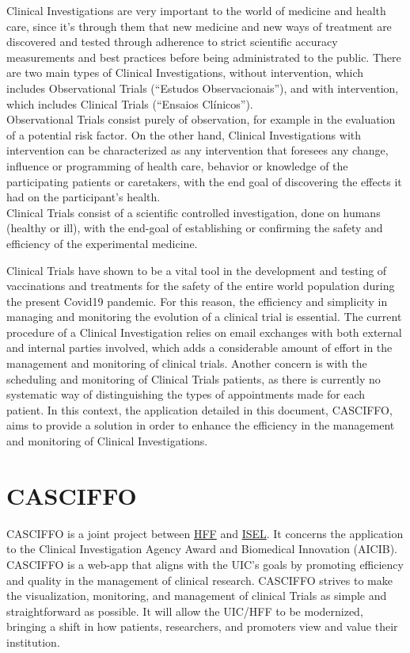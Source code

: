 Clinical Investigations are very important to the world of medicine and
health care, since it's through them that new medicine and new ways of
treatment are discovered and tested through adherence to strict
scientific accuracy measurements and best practices before being
administrated to the public. There are two main types of Clinical
Investigations, without intervention, which includes Observational
Trials (``Estudos Observacionais''), and with intervention, which
includes Clinical Trials (``Ensaios Clínicos'').\\
Observational Trials consist purely of observation, for example in the
evaluation of a potential risk factor. On the other hand, Clinical
Investigations with intervention can be characterized as any
intervention that foresees any change, influence or programming of
health care, behavior or knowledge of the participating patients or
caretakers, with the end goal of discovering the effects it had on the
participant's health.\\
Clinical Trials consist of a scientific controlled investigation, done
on humans (healthy or ill), with the end-goal of establishing or confirming the safety and efficiency of the experimental medicine.  

Clinical Trials have shown to be a vital tool in the development and testing of vaccinations and treatments for the safety of the entire world population during the present Covid19 pandemic. For this reason, the efficiency and simplicity in managing and monitoring the evolution of a clinical trial is essential.  
The current procedure of a Clinical Investigation relies on email exchanges with both external and internal parties involved, which adds a considerable amount of effort in the management and monitoring of clinical trials. Another concern is with the scheduling and monitoring of Clinical Trials patients, as there is currently no systematic way of distinguishing the types of appointments made for each patient.  
In this context, the application detailed in this document, CASCIFFO, aims to provide a solution in order to enhance the efficiency in the management and monitoring of Clinical Investigations.


\section{CASCIFFO}\label{c2-s2-casciffo}

CASCIFFO is a joint project between \href{https://hff.min-saude.pt/}{HFF} and \href{https://www.isel.pt/}{ISEL}. It concerns the application to the Clinical Investigation Agency Award and Biomedical Innovation (AICIB).  
CASCIFFO is a web-app that aligns with the UIC's goals by promoting efficiency and quality in the management of clinical research.
CASCIFFO strives to make the visualization, monitoring, and management of clinical Trials as simple and straightforward as possible.   
It will allow the UIC/HFF to be modernized, bringing a shift in how patients, researchers, and promoters view and value their institution.  

